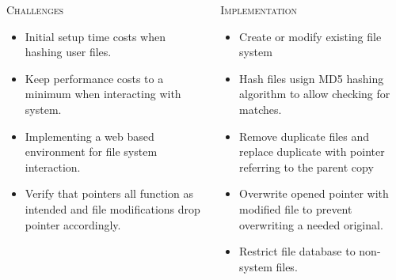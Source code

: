 \documentclass[final,t]{beamer}
\begin{document}
\begin{frame}{}
\begin{columns}[t]
\begin{column}{.325\linewidth}
\begin{block}{\textsc{Challenges}}
\begin{itemize}
            \item Initial setup time costs when hashing user files.

            \item Keep performance costs to a minimum when interacting with system.

            \item Implementing a web based environment for file system interaction.
            
            \item Verify that pointers all function as intended and file modifications drop pointer accordingly.

          \end{itemize}

          \vspace*{.2in}    
          
	\end{block}

	\end{column}

%
%
      \begin{column}{.325\linewidth}	
		
        \begin{block}{\textsc{Implementation}}
          \begin{itemize}

            \item Create or modify existing file system

            \item Hash files usign MD5 hashing algorithm to allow checking for matches.

            \item Remove duplicate files and replace duplicate with pointer referring to the parent copy

            \item Overwrite opened pointer with modified file to prevent overwriting a needed original.

            \item Restrict file database to non-system files.

          \end{itemize}


\end{block}
\end{column}
\end{columns}
\end{frame}
\end{document}
